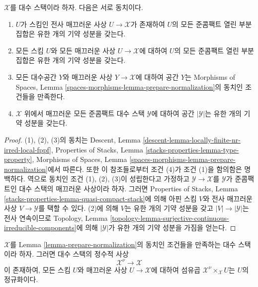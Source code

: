 \begin{lemma}
\label{lemma-prepare-normalization}
$\mathcal{X}$를 대수 스택이라 하자. 다음은 서로 동치이다.
\begin{enumerate}
\item $U$가 스킴인 전사 매끄러운 사상 $U \to \mathcal{X}$가 존재하여
$U$의 모든 준콤팩트 열린 부분집합은 유한 개의 기약 성분을 갖는다.
\item 모든 스킴 $U$와 모든 매끄러운 사상 $U \to \mathcal{X}$에 대하여
$U$의 모든 준콤팩트 열린 부분집합은 유한 개의 기약 성분을 갖는다.
\item 모든 대수공간 $Y$와 매끄러운 사상 $Y \to \mathcal{X}$에 대하여
공간 $Y$는 Morphisms of Spaces, Lemma
\ref{spaces-morphisms-lemma-prepare-normalization}의 동치인 조건들을
만족한다.
\item $\mathcal{X}$ 위에서 매끄러운 모든 준콤팩트 대수 스택
$\mathcal{Y}$에 대하여 공간 $|\mathcal{Y}|$는 유한 개의 기약 성분을
갖는다.
\end{enumerate}
\end{lemma}

\begin{proof}
(1), (2), (3)의 동치는 Descent, Lemma
\ref{descent-lemma-locally-finite-nr-irred-local-fppf}, Properties of Stacks,
Lemma \ref{stacks-properties-lemma-type-property}, Morphisms of Spaces, Lemma
\ref{spaces-morphisms-lemma-prepare-normalization}에서 따른다. 또한 이
참조들로부터 조건 (4)가 조건 (1)을 함의함은 명백하다. 역으로 동치인 조건
(1), (2), (3)이 성립한다고 가정하고
$\mathcal{Y} \to \mathcal{X}$를 $\mathcal{Y}$가 준콤팩트인 대수 스택의
매끄러운 사상이라 하자. 그러면 Properties of Stacks, Lemma
\ref{stacks-properties-lemma-quasi-compact-stack}에 의해 아핀 스킴 $V$와
전사 매끄러운 사상 $V \to \mathcal{Y}$를 택할 수 있다. (2)에 의해
$V$는 유한 개의 기약 성분을 갖고
$|V| \to |\mathcal{Y}|$는 전사 연속이므로 Topology, Lemma
\ref{topology-lemma-surjective-continuous-irreducible-components}에 의해
$|\mathcal{Y}|$가 유한 개의 기약 성분을 가짐을 얻는다.
\end{proof}

\begin{lemma}
\label{lemma-normalization}
$\mathcal{X}$를 Lemma \ref{lemma-prepare-normalization}의 동치인 조건들을
만족하는 대수 스택이라 하자. 그러면 대수 스택의 정수적 사상
$$
\mathcal{X}^\nu \longrightarrow \mathcal{X}
$$
이 존재하여, 모든 스킴 $U$와 매끄러운 사상 $U \to \mathcal{X}$에 대하여
섬유곱 $\mathcal{X}^\nu \times_\mathcal{X} U$는 $U$의 정규화이다.
\end{lemma}

